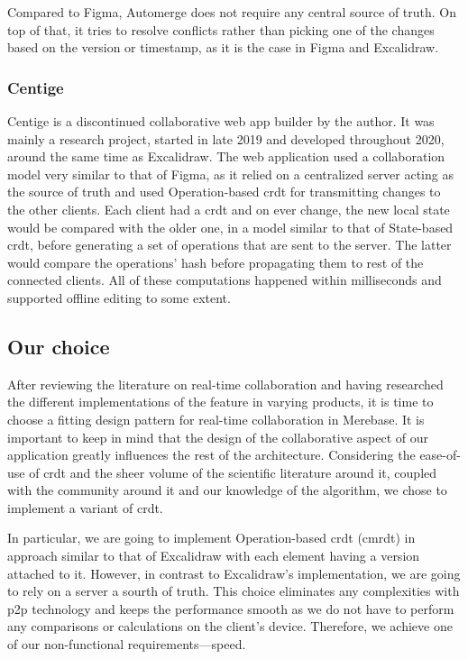 Compared to Figma, Automerge does not require any central source of truth. On top of that, it tries to resolve conflicts rather than picking one of the changes based on the version or timestamp, as it is the case in Figma and Excalidraw.

\subsubsection{Centige}

Centige is a discontinued collaborative web app builder by the author.
It was mainly a research project, started in late 2019 and developed throughout 2020, around the same time as Excalidraw.
The web application used a collaboration model very similar to that of Figma, as it relied on a centralized server acting as the source of truth and used Operation-based \acrshort{crdt} for transmitting changes to the other clients.
Each client had a \acrfull{crdt} and on ever change, the new local state would be compared with the older one, in a model similar to that of State-based \acrshort{crdt}, before generating a set of operations that are sent to the server.
The latter would compare the operations' hash before propagating them to rest of the connected clients.
All of these computations happened within milliseconds and supported offline editing to some extent.

\subsection{Our choice}

After reviewing the literature on real-time collaboration and having researched the different implementations of the feature in varying products, it is time to choose a fitting design pattern for real-time collaboration in Merebase.
It is important to keep in mind that the design of the collaborative aspect of our application greatly influences the rest of the architecture.
Considering the ease-of-use of \acrfull{crdt} and the sheer volume of the scientific literature around it, coupled with the community around it and our knowledge of the algorithm, we chose to implement a variant of \acrshort{crdt}.

In particular, we are going to implement Operation-based \acrshort{crdt} (\acrshort{cmrdt}) in approach similar to that of Excalidraw with each element having a version attached to it.
However, in contrast to Excalidraw's implementation, we are going to rely on a server a sourth of truth.
This choice eliminates any complexities with \acrshort{p2p} technology and keeps the performance smooth as we do not have to perform any comparisons or calculations on the client's device. Therefore, we achieve one of our non-functional requirements---speed.

